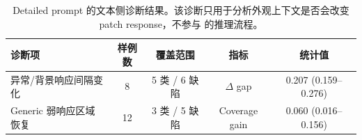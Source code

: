 \begin{table}[t]
\centering
\caption{Detailed prompt 的文本侧诊断结果。该诊断只用于分析外观上下文是否会改变 patch response，不参与 \method{} 的推理流程。}
\label{tab:detail-prompt-diagnostic}
\small
\setlength{\tabcolsep}{5pt}
\begin{tabular}{@{}lcccc@{}}
\toprule
诊断项 & 样例数 & 覆盖范围 & 指标 & 统计值 \\
\midrule
异常/背景响应间隔变化 & 8 & 5 类 / 6 缺陷 & $\Delta$ gap & 0.207 (0.159--0.276) \\
Generic 弱响应区域恢复 & 12 & 3 类 / 5 缺陷 & Coverage gain & 0.060 (0.016--0.156) \\
\bottomrule
\end{tabular}
\end{table}
